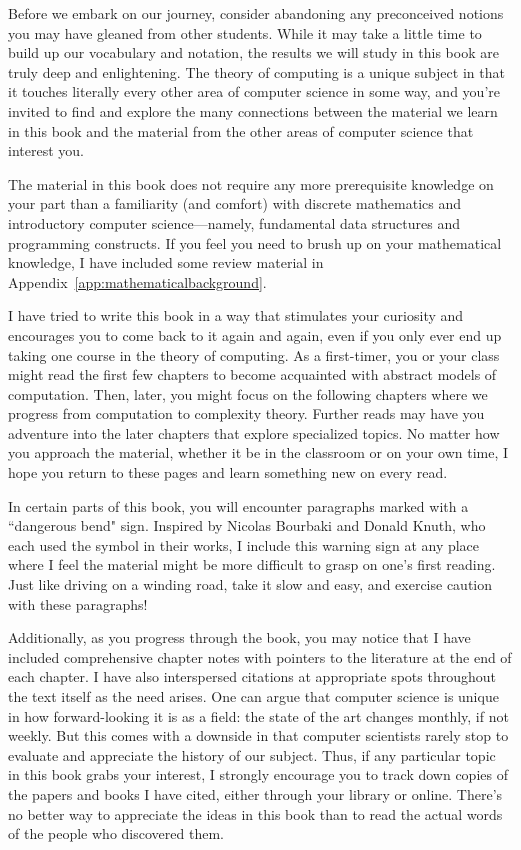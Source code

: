 Before we embark on our journey, consider abandoning any preconceived notions you may have gleaned from other students. While it may take a little time to build up our vocabulary and notation, the results we will study in this book are truly deep and enlightening. The theory of computing is a unique subject in that it touches literally every other area of computer science in some way, and you're invited to find and explore the many connections between the material we learn in this book and the material from the other areas of computer science that interest you.

The material in this book does not require any more prerequisite knowledge on your part than a familiarity (and comfort) with discrete mathematics and introductory computer science---namely, fundamental data structures and programming constructs. If you feel you need to brush up on your mathematical knowledge, I have included some review material in Appendix~\ref{app:mathematicalbackground}.

I have tried to write this book in a way that stimulates your curiosity and encourages you to come back to it again and again, even if you only ever end up taking one course in the theory of computing. As a first-timer, you or your class might read the first few chapters to become acquainted with abstract models of computation. Then, later, you might focus on the following chapters where we progress from computation to complexity theory. Further reads may have you adventure into the later chapters that explore specialized topics. No matter how you approach the material, whether it be in the classroom or on your own time, I hope you return to these pages and learn something new on every read.

\begin{dangerous}
In certain parts of this book, you will encounter paragraphs marked with a ``dangerous bend" sign. Inspired by Nicolas Bourbaki and Donald Knuth, who each used the symbol in their works, I include this warning sign at any place where I feel the material might be more difficult to grasp on one's first reading. Just like driving on a winding road, take it slow and easy, and exercise caution with these paragraphs!
\end{dangerous}

Additionally, as you progress through the book, you may notice that I have included comprehensive chapter notes with pointers to the literature at the end of each chapter. I have also interspersed citations at appropriate spots throughout the text itself as the need arises. One can argue that computer science is unique in how forward-looking it is as a field: the state of the art changes monthly, if not weekly. But this comes with a downside in that computer scientists rarely stop to evaluate and appreciate the history of our subject. Thus, if any particular topic in this book grabs your interest, I strongly encourage you to track down copies of the papers and books I have cited, either through your library or online. There's no better way to appreciate the ideas in this book than to read the actual words of the people who discovered them.

